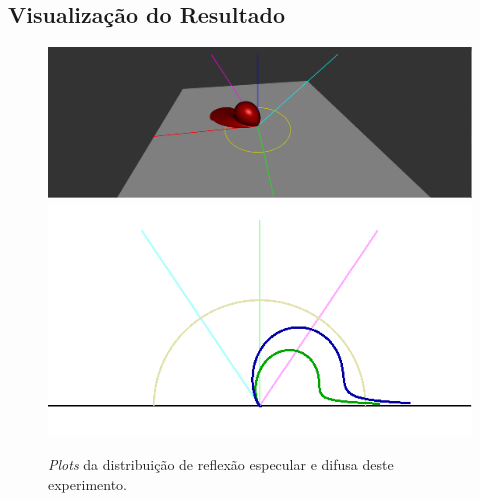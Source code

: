 \subsection{Visualização do Resultado}
\begin{figure}[H]
    \caption{\small{\textit{Plots} da distribuição de reflexão especular e difusa deste experimento.}}
    \label{fig-cook-torrance-alternative-plots}
    \vspace{42px}
  \includegraphics[width=\linewidth]{./Imagens/brdfs/cook-torrance-alternative-3D-plot}
\endminipage\hfill
{}
  \includegraphics[width=\linewidth]{./Imagens/brdfs/cook-torrance-alternative-polar-plot-log.png}
\endminipage\hfill
\end{figure}

